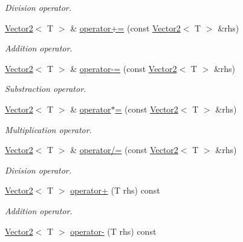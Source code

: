 \begin{DoxyCompactItemize}
\begin{DoxyCompactList}\small\item\em Division operator. \item\end{DoxyCompactList}\item 
\hyperlink{class_vector2}{Vector2}$<$ T $>$ \& \hyperlink{class_vector2_ac81fd06dc944404ab96e387a9c810d41}{operator+=} (const \hyperlink{class_vector2}{Vector2}$<$ T $>$ \&rhs)
\begin{DoxyCompactList}\small\item\em Addition operator. \item\end{DoxyCompactList}\item 
\hyperlink{class_vector2}{Vector2}$<$ T $>$ \& \hyperlink{class_vector2_adf7f03dd1b698850baaff61b21ec501f}{operator-\/=} (const \hyperlink{class_vector2}{Vector2}$<$ T $>$ \&rhs)
\begin{DoxyCompactList}\small\item\em Substraction operator. \item\end{DoxyCompactList}\item 
\hyperlink{class_vector2}{Vector2}$<$ T $>$ \& \hyperlink{class_vector2_aefae77616723d6c857a3e21dd5ea70e7}{operator$\ast$=} (const \hyperlink{class_vector2}{Vector2}$<$ T $>$ \&rhs)
\begin{DoxyCompactList}\small\item\em Multiplication operator. \item\end{DoxyCompactList}\item 
\hyperlink{class_vector2}{Vector2}$<$ T $>$ \& \hyperlink{class_vector2_a7cf62fe9339f503b680daaeacc71eb4c}{operator/=} (const \hyperlink{class_vector2}{Vector2}$<$ T $>$ \&rhs)
\begin{DoxyCompactList}\small\item\em Division operator. \item\end{DoxyCompactList}\item 
\hyperlink{class_vector2}{Vector2}$<$ T $>$ \hyperlink{class_vector2_a17527e8fe674085b892ccfcb42cd85b3}{operator+} (T rhs) const 
\begin{DoxyCompactList}\small\item\em Addition operator. \item\end{DoxyCompactList}\item 
\hyperlink{class_vector2}{Vector2}$<$ T $>$ \hyperlink{class_vector2_ac6729c8cb9d0eb0a5f1aeb3093c1669f}{operator-\/} (T rhs) const 

\end{DoxyCompactItemize}
